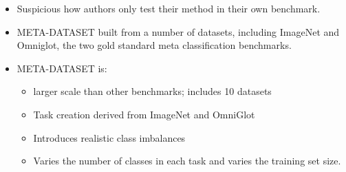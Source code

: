 \documentclass{article}
\begin{document}
\begin{itemize}
		\item Suspicious how authors only test their method in their own benchmark.
		
		\item META-DATASET built from a number of datasets, including ImageNet and Omniglot, the two gold standard meta classification benchmarks.
		
		
		\item META-DATASET is:
		\begin{itemize}
			\item larger scale than other benchmarks; includes 10 datasets
			\item Task creation derived from ImageNet and OmniGlot
			\item Introduces realistic class imbalances
			\item Varies the number of classes in each task and varies the training set size.
		\end{itemize}
		
	\end{itemize}
\end{document}
